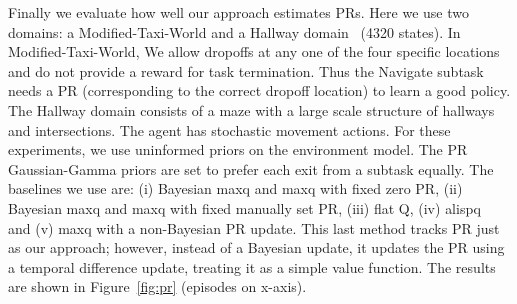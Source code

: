

Finally we evaluate how well our approach estimates
PRs. Here we use two domains: a {\sf Modified-Taxi-World}
and a {\sf Hallway} domain~\cite{d-hrl-00,parr:thesis} (4320
states). In {\sf Modified-Taxi-World}, We allow dropoffs at any one of
the four specific locations and do not provide a reward for task
termination. Thus the Navigate subtask needs a PR
(corresponding to the correct dropoff location) to learn a good
policy.  The {\sf Hallway} domain consists of a maze with a large
scale structure of hallways and intersections. The agent has
stochastic movement actions. 
For these experiments, we use uninformed priors on the environment
model. The PR Gaussian-Gamma priors are set to prefer each
exit from a subtask equally. The baselines we use are: (i) Bayesian
{\sc maxq} and {\sc maxq} with fixed zero PR, (ii) Bayesian
{\sc maxq} and {\sc maxq} with fixed manually set PR, (iii)
flat Q, (iv) {\sc alispq}~\cite{alisp} and (v) {\sc maxq} with
a non-Bayesian PR update. This last method tracks
PR just as our approach; however, instead of a Bayesian
update, it updates the PR using a temporal difference
update, treating it as a simple value function. The results are shown
in Figure~\ref{fig:pr} (episodes on x-axis).

